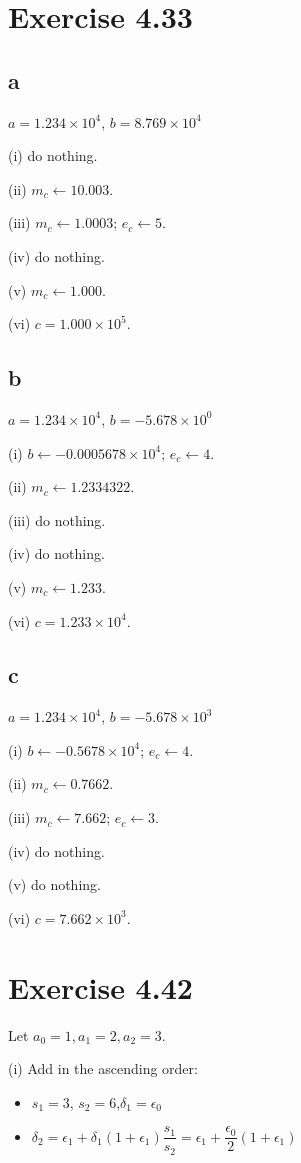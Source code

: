 \documentclass[a4paper]{article}
\begin{document}
\section*{Exercise 4.33}
\subsection*{a}
$a = 1.234 \times 10^4$, $b = 8.769 \times 10^4$

(i) do nothing.

(ii) $m_c \leftarrow 10.003$.

(iii) $m_c \leftarrow 1.0003$; $e_c \leftarrow 5$.

(iv) do nothing.

(v) $m_c \leftarrow 1.000$.

(vi) $c = 1.000 \times 10^5$.

\subsection*{b}
$a = 1.234 \times 10^4$, $b = -5.678 \times 10^0$

(i) $b \leftarrow -0.0005678 \times 10^4$; $e_c \leftarrow 4$.

(ii) $m_c \leftarrow 1.2334322$.

(iii) do nothing.

(iv) do nothing.

(v) $m_c \leftarrow 1.233$.

(vi) $c = 1.233 \times 10^4$.

\subsection*{c}
$a = 1.234 \times 10^4$, $b = -5.678 \times 10^3$

(i) $b \leftarrow -0.5678 \times 10^4$; $e_c \leftarrow 4$.

(ii) $m_c \leftarrow 0.7662$.

(iii) $m_c \leftarrow 7.662$; $e_c \leftarrow 3$.

(iv) do nothing.

(v) do nothing.

(vi) $c = 7.662 \times 10^3$.


\section*{Exercise 4.42}
Let $a_0 = 1, a_1 = 2, a_2 =3$.

(i) Add in the ascending order:
\begin{itemize}
  \item $s_1 = 3$, $s_2 = 6$,$\delta_1 = \epsilon_0$
  \item $\delta_2 = \epsilon_1 + \delta_1(1 + \epsilon_1)\dfrac{s_1}{s_2} = \epsilon_1 + \dfrac{\epsilon_0}{2}(1 + \epsilon_1)$
\end{itemize}
\end{document}
